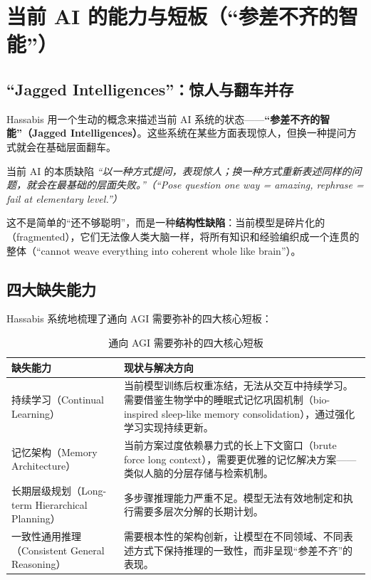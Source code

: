 \section{当前 AI 的能力与短板（``参差不齐的智能''）}

\subsection{``Jagged Intelligences''：惊人与翻车并存}

Hassabis 用一个生动的概念来描述当前 AI 系统的状态——\textbf{``参差不齐的智能''（Jagged Intelligences）}。这些系统在某些方面表现惊人，但换一种提问方式就会在基础层面翻车。

\begin{warningbox}{当前 AI 的本质缺陷}
\textit{``以一种方式提问，表现惊人；换一种方式重新表述同样的问题，就会在最基础的层面失败。''（``Pose question one way = amazing, rephrase = fail at elementary level.''）}

这不是简单的``还不够聪明''，而是一种\textbf{结构性缺陷}：当前模型是碎片化的（fragmented），它们无法像人类大脑一样，将所有知识和经验编织成一个连贯的整体（``cannot weave everything into coherent whole like brain''）。
\end{warningbox}

\subsection{四大缺失能力}

Hassabis 系统地梳理了通向 AGI 需要弥补的四大核心短板：

\begin{table}[H]
\centering
\begin{tabular}{p{} p{}}
\toprule
\textbf{缺失能力} & \textbf{现状与解决方向} \\
\midrule
持续学习（Continual Learning） & 当前模型训练后权重冻结，无法从交互中持续学习。需要借鉴生物学中的睡眠式记忆巩固机制（bio-inspired sleep-like memory consolidation），通过强化学习实现持续更新。 \\
记忆架构（Memory Architecture） & 当前方案过度依赖暴力式的长上下文窗口（brute force long context），需要更优雅的记忆解决方案——类似人脑的分层存储与检索机制。 \\
长期层级规划（Long-term Hierarchical Planning） & 多步骤推理能力严重不足。模型无法有效地制定和执行需要多层次分解的长期计划。 \\
一致性通用推理（Consistent General Reasoning） & 需要根本性的架构创新，让模型在不同领域、不同表述方式下保持推理的一致性，而非呈现``参差不齐''的表现。 \\
\bottomrule
\end{tabular}
\caption{通向 AGI 需要弥补的四大核心短板}
\end{table}

